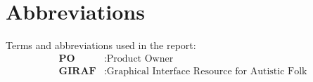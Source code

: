 \chapter*{Abbreviations}
Terms and abbreviations used in the report:
\begin{align*}
    \textbf{PO} &: \text{Product Owner} \\
    \textbf{GIRAF} &: \text{Graphical Interface Resource for Autistic Folk}
\end{align*}
